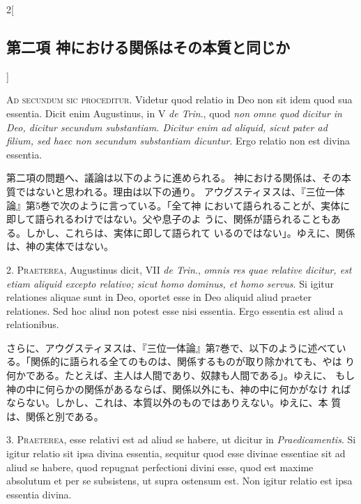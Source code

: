 \documentclass[paper=a4paper,fontsize=10pt,jafontsize=9pt,titlepage]{jlreq}
\begin{document}
\begin{paracol}{2}[\subsection{第二項 神における関係はその本質と同じか}]

{\Huge A}{\scshape d secundum sic proceditur}. Videtur quod relatio in Deo non sit idem
quod sua essentia. Dicit enim Augustinus, in V {\itshape de Trin}., quod {\itshape non omne
quod dicitur in Deo, dicitur secundum substantiam. Dicitur enim ad
aliquid, sicut pater ad filium, sed haec non secundum substantiam
dicuntur}. Ergo relatio non est divina essentia.


\switchcolumn


第二項の問題へ、議論は以下のように進められる。
神における関係は、その本質ではないと思われる。理由は以下の通り。
アウグスティヌスは、『三位一体論』第5巻で次のように言っている。「全て神
 において語られることが、実体に即して語られるわけではない。父や息子のよ
 うに、関係が語られることもある。しかし、これらは、実体に即して語られて
 いるのではない」。ゆえに、関係は、神の実体ではない。




2. {\scshape Praeterea}, Augustinus dicit, VII {\itshape de Trin}., {\itshape omnis res quae relative
dicitur, est etiam aliquid excepto relativo; sicut homo dominus, et homo
servus}. Si igitur relationes aliquae sunt in Deo, oportet esse in Deo
aliquid aliud praeter relationes. Sed hoc aliud non potest esse nisi
essentia. Ergo essentia est aliud a relationibus.


\switchcolumn


さらに、アウグスティヌスは、『三位一体論』第7巻で、以下のように述べてい
 る。「関係的に語られる全てのものは、関係するものが取り除かれても、やは
 り何かである。たとえば、主人は人間であり、奴隷も人間である」。ゆえに、
 もし神の中に何らかの関係があるならば、関係以外にも、神の中に何かがなけ
 ればならない。しかし、これは、本質以外のものではありえない。ゆえに、本
 質は、関係と別である。




3. {\scshape Praeterea}, esse relativi est ad aliud se habere, ut dicitur in
{\itshape Praedicamentis}. Si igitur relatio sit ipsa divina essentia, sequitur
quod esse divinae essentiae sit ad aliud se habere, quod repugnat
perfectioni divini esse, quod est maxime absolutum et per se subsistens,
ut supra ostensum est. Non igitur relatio est ipsa essentia divina.



\end{paracol}
\end{document}
